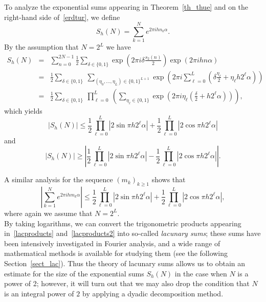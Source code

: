 \documentclass[12pt]{amsart}
\begin{document}
To analyze the exponential sums appearing in Theorem~\ref{th_thue} and on the right-hand side of~\eqref{erdtur}, we define
$$
S_h(N) = \sum_{k=1}^N e^{2 \pi i h n_k \alpha}.
$$
By the assumption that $N=2^L$ we have
\begin{eqnarray}
S_h(N) & = & \sum_{n=0}^{2N-1} \frac{1}{2} \sum_{\delta \in \{0,1\}} \exp \left(2 \pi i \delta \frac{s_2(n)}{2} \right) \exp \left(2 \pi i h n \alpha\right) \nonumber\\
& = & \frac{1}{2} \sum_{\delta \in \{0,1\}} ~\sum_{(\eta_0, \dots, \eta_{L}) \in \{0,1\}^{L+1}} \exp \left( 2 \pi i \sum_{\ell=0}^{L} \left(\delta \frac{\eta_\ell}{2} + \eta_\ell h 2^\ell \alpha \right) \right) \nonumber\\
& = & \frac{1}{2} \sum_{\delta \in \{0,1\}} ~\prod_{\ell=0}^{L} ~\left(\sum_{\eta_\ell \in \{0,1\}} \exp \left( 2 \pi i \eta_\ell \left( \frac{\delta}{2} + h 2^\ell \alpha \right)\right)\right), \nonumber
\end{eqnarray}
which yields
\begin{equation}
|S_h(N) |  \leq  \frac{1}{2} \prod_{\ell=0}^{L} |2 \sin \pi h 2^\ell \alpha| + \frac{1}{2} \prod_{\ell=0}^{L}| 2 \cos \pi h 2^\ell \alpha| \label{lacproducts}
\end{equation}
and
\begin{equation}
|S_h(N) | \geq   \left|\frac{1}{2} \prod_{\ell=0}^{L} |2 \sin \pi h 2^\ell \alpha| - \frac{1}{2} \prod_{\ell=0}^{L}| 2 \cos \pi h 2^\ell \alpha|\right|.\label{lacproductsLB}
\end{equation}

A similar analysis for the sequence $(m_k)_{k \geq 1}$ shows that
\begin{equation}
\left|\sum_{k=1}^N e^{2 \pi i h m_k \alpha}\right| \leq  \frac{1}{2} \prod_{\ell=0}^{L} |2 \sin \pi h 2^\ell \alpha| + \frac{1}{2} \prod_{\ell=0}^{L} |2 \cos \pi h 2^\ell \alpha|, \label{lacproducts2}
\end{equation}
where again we assume that $N=2^L$.\\

By taking logarithms, we can convert the trigonometric products appearing in~\eqref{lacproducts} and~\eqref{lacproducts2} into so-called \emph{lacunary sums}; these sums have been intensively investigated in Fourier analysis, and a wide range of mathematical methods is available for studying them (see the following Section~\ref{sect_lac}). Thus the theory of lacunary sums allows us to obtain an estimate for the size of the exponential sums $S_{h} (N)$ in the case when $N$ is a power of 2; however, it will turn out that we may also drop the condition that $N$ is an integral power of $2$ by applying a dyadic decomposition method.\\
\end{document}
